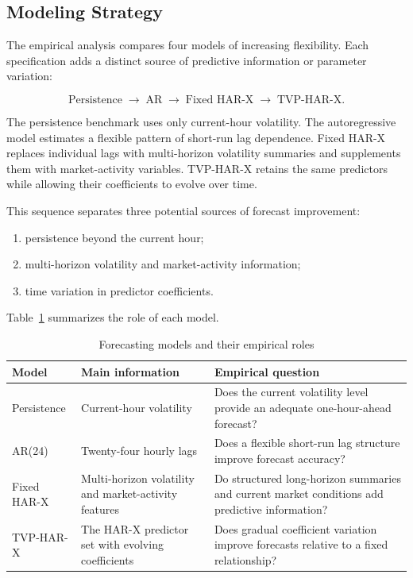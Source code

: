 \subsection{Modeling Strategy}

The empirical analysis compares four models of increasing
flexibility. Each specification adds a distinct source of
predictive information or parameter variation:

\[
\text{Persistence}
\;\longrightarrow\;
\text{AR}
\;\longrightarrow\;
\text{Fixed HAR-X}
\;\longrightarrow\;
\text{TVP-HAR-X}.
\]

The persistence benchmark uses only current-hour volatility.
The autoregressive model estimates a flexible pattern of
short-run lag dependence. Fixed HAR-X replaces individual lags
with multi-horizon volatility summaries and supplements them
with market-activity variables. TVP-HAR-X retains the same
predictors while allowing their coefficients to evolve over
time.

This sequence separates three potential sources of forecast
improvement:

\begin{enumerate}[label=(\roman*)]
    \item persistence beyond the current hour;
    \item multi-horizon volatility and market-activity
    information;
    \item time variation in predictor coefficients.
\end{enumerate}

Table~\ref{tab:model-roles} summarizes the role of each model.

\begin{table}[H]
\centering
\caption{Forecasting models and their empirical roles}
\label{tab:model-roles}
\begin{tabular}{p{3.0cm}p{4.2cm}p{6.0cm}}
\toprule
Model
& Main information
& Empirical question \\
\midrule
Persistence
& Current-hour volatility
& Does the current volatility level provide an adequate
one-hour-ahead forecast? \\

AR(24)
& Twenty-four hourly lags
& Does a flexible short-run lag structure improve forecast
accuracy? \\

Fixed HAR-X
& Multi-horizon volatility and market-activity features
& Do structured long-horizon summaries and current market
conditions add predictive information? \\

TVP-HAR-X
& The HAR-X predictor set with evolving coefficients
& Does gradual coefficient variation improve forecasts relative
to a fixed relationship? \\
\bottomrule
\end{tabular}
\end{table}

